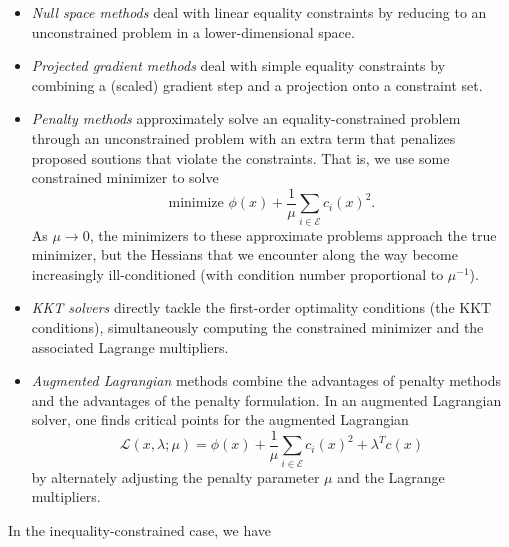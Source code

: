 \documentclass[12pt, leqno]{article} %
\providecommand{\tightlist}{%
  \setlength{\itemsep}{0pt}\setlength{\parskip}{0pt}}
\begin{document}
\begin{itemize}
\tightlist
\item
  \emph{Null space methods} deal with linear equality constraints by
  reducing to an unconstrained problem in a lower-dimensional space.
\item
  \emph{Projected gradient methods} deal with simple equality
  constraints by combining a (scaled) gradient step and a projection
  onto a constraint set.
\item
  \emph{Penalty methods} approximately solve an equality-constrained
  problem through an unconstrained problem with an extra term that
  penalizes proposed soutions that violate the constraints. That is, we
  use some constrained minimizer to solve
  \[\mbox{minimize } \phi(x) + \frac{1}{\mu} \sum_{i \in\mathcal{E}} c_i(x)^2.\]
  As \(\mu \rightarrow 0\), the minimizers to these approximate problems
  approach the true minimizer, but the Hessians that we encounter along
  the way become increasingly ill-conditioned (with condition number
  proportional to \(\mu^{-1}\)).
\item
  \emph{KKT solvers} directly tackle the first-order optimality
  conditions (the KKT conditions), simultaneously computing the
  constrained minimizer and the associated Lagrange multipliers.
\item
  \emph{Augmented Lagrangian} methods combine the advantages of penalty
  methods and the advantages of the penalty formulation. In an augmented
  Lagrangian solver, one finds critical points for the augmented
  Lagrangian \[\mathcal{L}(x, \lambda; \mu) =
  \phi(x) + \frac{1}{\mu} \sum_{i \in \mathcal{E}} c_i(x)^2 + \lambda^T c(x)\]
  by alternately adjusting the penalty parameter \(\mu\) and the
  Lagrange multipliers.
\end{itemize}

In the inequality-constrained case, we have
\end{document}
